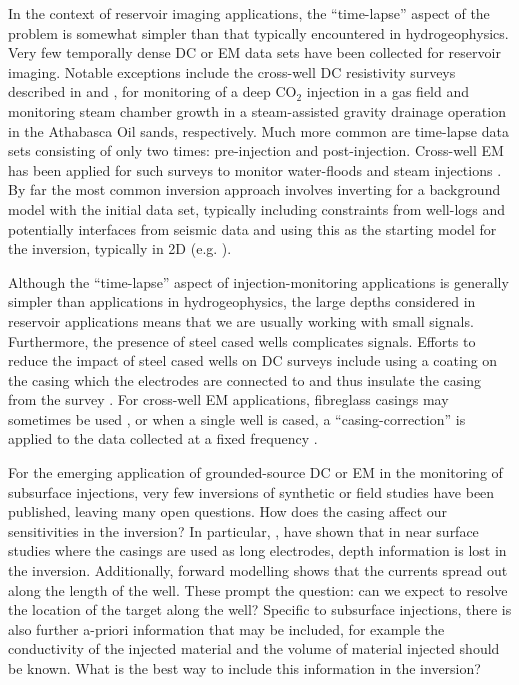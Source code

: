 In the context of reservoir imaging applications, the ``time-lapse'' aspect of the problem is somewhat simpler than that typically encountered in hydrogeophysics. Very few temporally dense DC or EM data sets have been collected for reservoir imaging. Notable exceptions include the cross-well DC resistivity surveys described in \cite{Carrigan2013} and \cite{Tondel2014}, for monitoring of a deep CO$_2$ injection in a gas field and monitoring steam chamber growth in a steam-assisted gravity drainage operation in the Athabasca Oil sands, respectively. Much more common are time-lapse data sets consisting of only two times: pre-injection and post-injection. Cross-well EM has been applied for such surveys to monitor water-floods \citep{Wilt2005, Wilt2012} and steam injections \citep{Wilt1996, Wilt1997, Marion2011}. By far the most common inversion approach involves inverting for a background model with the initial data set, typically including constraints from well-logs and potentially interfaces from seismic data and using this as the starting model for the inversion, typically in 2D (e.g. \cite{Wilt2012}).

Although the ``time-lapse'' aspect of injection-monitoring applications is generally simpler than applications in hydrogeophysics, the large depths considered in reservoir applications means that we are usually working with small signals. Furthermore, the presence of steel cased wells complicates signals. Efforts to reduce the impact of steel cased wells on DC surveys include using a coating on the casing which the electrodes are connected to and thus insulate the casing from the survey \citep{Tondel2014}. For cross-well EM applications, fibreglass casings may sometimes be used \citep{Wilt2012}, or when a single well is cased, a ``casing-correction'' is applied to the data collected at a fixed frequency \citep{Augustin1989a, Becker1997}.

For the emerging application of grounded-source DC or EM in the monitoring of subsurface injections, very few inversions of synthetic or field studies have been published, leaving many open questions. How does the casing affect our sensitivities in the inversion? In particular, \cite{Rucker2012}, have shown that in near surface studies where the casings are used as long electrodes, depth information is lost in the inversion. Additionally, forward modelling shows that the currents spread out along the length of the well. These prompt the question: can we expect to resolve the location of the target along the well? Specific to subsurface injections, there is also further a-priori information that may be included, for example the conductivity of the injected material and the volume of material injected should be known. What is the best way to include this information in the inversion?

